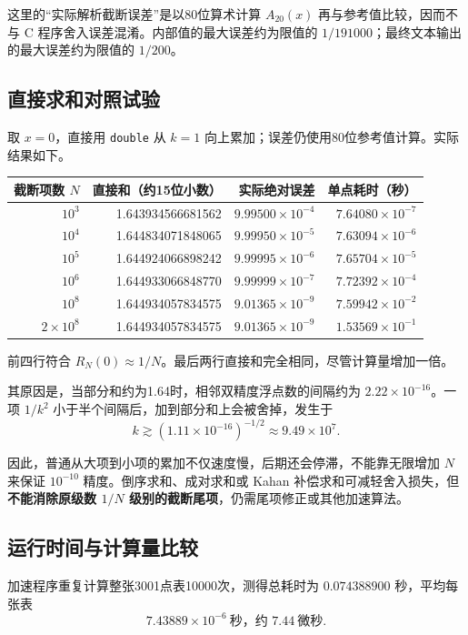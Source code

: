 \documentclass[UTF8,fontset=fandol,zihao=-4,a4paper]{ctexart}
\begin{document}
这里的“实际解析截断误差”是以80位算术计算 $A_{20}(x)$ 再与参考值比较，因而不与 C 程序舍入误差混淆。内部值的最大误差约为限值的 $1/191000$；最终文本输出的最大误差约为限值的 $1/200$。

\subsection{直接求和对照试验}
取 $x=0$，直接用 \texttt{double} 从 $k=1$ 向上累加；误差仍使用80位参考值计算。实际结果如下。
\begin{center}
\small
\begin{tabular}{r r r r}
\toprule
截断项数 $N$ & 直接和（约15位小数） & 实际绝对误差 & 单点耗时（秒）\\
\midrule
$10^3$ & 1.643934566681562 & $9.99500\times10^{-4}$ & $7.64080\times10^{-7}$\\
$10^4$ & 1.644834071848065 & $9.99950\times10^{-5}$ & $7.63094\times10^{-6}$\\
$10^5$ & 1.644924066898242 & $9.99995\times10^{-6}$ & $7.65704\times10^{-5}$\\
$10^6$ & 1.644933066848770 & $9.99999\times10^{-7}$ & $7.72392\times10^{-4}$\\
$10^8$ & 1.644934057834575 & $9.01365\times10^{-9}$ & $7.59942\times10^{-2}$\\
$2\times10^8$ & 1.644934057834575 & $9.01365\times10^{-9}$ & $1.53569\times10^{-1}$\\
\bottomrule
\end{tabular}
\end{center}

前四行符合 $R_N(0)\approx1/N$。最后两行直接和完全相同，尽管计算量增加一倍。

其原因是，当部分和约为1.64时，相邻双精度浮点数的间隔约为 $2.22\times10^{-16}$。一项 $1/k^2$ 小于半个间隔后，加到部分和上会被舍掉，发生于
\[
 k\gtrsim\left(1.11\times10^{-16}\right)^{-1/2}
 \approx9.49\times10^7.
\]

因此，普通从大项到小项的累加不仅速度慢，后期还会停滞，不能靠无限增加 $N$ 来保证 $10^{-10}$ 精度。倒序求和、成对求和或 Kahan 补偿求和可减轻舍入损失，但\textbf{不能消除原级数 $1/N$ 级别的截断尾项}，仍需尾项修正或其他加速算法。

\subsection{运行时间与计算量比较}
加速程序重复计算整张3001点表10000次，测得总耗时为 $0.074388900$ 秒，平均每张表
\[
 \boxed{7.43889\times10^{-6}\ \text{秒，约 }7.44\ \text{微秒}.}
\]
\end{document}

